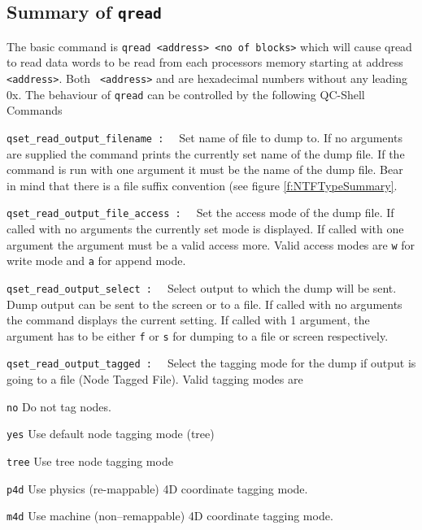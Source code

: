 \subsection{Summary of {\tt qread}}
The basic command is {\tt qread <address> <no of blocks>} which will
cause qread to read {\tt <no of blocks>} data words to be read from
each processors memory starting at address {\tt <address>}. Both {\tt
<address>} and {\tt <no of blocks>} are hexadecimal numbers without
any leading 0x.  The behaviour of {\tt qread} can be controlled by the following
QC-Shell Commands
\begin{description}
\item{\tt qset\_read\_output\_filename : \ } Set name of file to dump to.
If no arguments are supplied the command prints the currently set name
of the dump file. If the command is run with one argument it must be
the name of the dump file. Bear in mind that there is a file suffix
convention (see figure \ref{f:NTFTypeSummary}.
\item{\tt qset\_read\_output\_file\_access : \ } Set the access mode of the
dump file. If called with no arguments the currently set mode is displayed.
If called with one argument the argument must be a valid access more. 
Valid access modes are {\tt w} for write mode and {\tt a} for append mode.
\item{\tt qset\_read\_output\_select : \ }
Select output to which the dump will be sent. Dump output can be sent to 
the screen or to a file. If called with no arguments the command displays
the current setting. If called with 1 argument, the argument has to be
either {\tt f} or {\tt s} for dumping to a file or screen respectively.
\item{\tt qset\_read\_output\_tagged : \ }
Select the tagging mode for the dump if output is going to a file (Node Tagged File). Valid tagging modes are 
\begin{description}
\item{\tt no} Do not tag nodes.
\item{\tt yes} Use default node tagging mode (tree)
\item{\tt tree} Use tree node tagging mode
\item{\tt p4d} Use physics (re-mappable) 4D coordinate tagging mode.
\item{\tt m4d} Use machine (non--remappable) 4D coordinate tagging mode.
\end{description}
\end{description}


